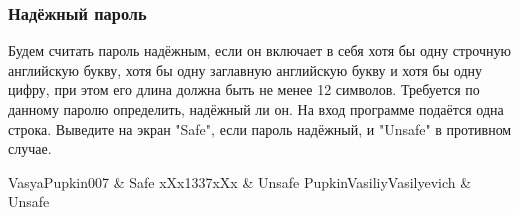 \begin{frame}
	\frametitle{Надёжный пароль}
 Будем считать пароль надёжным, если он включает в себя хотя бы одну строчную английскую букву, хотя бы одну заглавную английскую букву и хотя бы одну цифру, при этом его длина должна быть не менее 12 символов. Требуется по данному паролю определить, надёжный ли он. 
	\inp
	На вход программе подаётся одна строка.
	\out
	Выведите на экран "Safe", если пароль надёжный, и "Unsafe" в противном случае.
	\begin{ex}
		VasyaPupkin007 & Safe \tb
		xXx1337xXx & Unsafe \tb
		PupkinVasiliyVasilyevich & Unsafe \tb
	\end{ex}
\end{frame}


